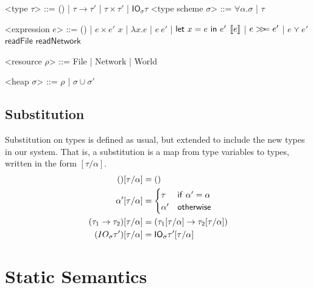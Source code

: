 \begin{grammar}

  <type $\tau$> ::= () | $\tau \rightarrow \tau'$ | $\tau \times \tau'$ | $\textsf{IO}_\sigma \tau$
  <type scheme $\sigma$> ::= $\forall \alpha . \sigma$ | $\tau$

<expression $e$> ::= () | $e \times e'$
\alt $x$ | $\lambda x . e$ | $e \ e'$ | $\mathsf{let} \ x = e \ \mathsf{in} \ e'$
\alt $[\![ e]\!]$ | $e >\!\!>\!\!= e'$ | $e \curlyvee e'$
\alt $\textsf{readFile}$
\alt $\textsf{readNetwork}$

<resource $\rho$> ::= \textsf{File} | \textsf{Network} | \textsf{World}

<heap $\sigma$> ::= $\rho$ | $\sigma \cup \sigma'$

\end{grammar}

\subsection{Substitution}
Substitution on types is defined as usual, but extended to include the
new types in our system. That is, a substitution is a map from type
variables to types, written in the form $[\tau/\alpha]$. 
\begin{align*}
  () [\tau/\alpha] &= () \\
  \alpha' [\tau/\alpha] &=
             \begin{cases}
               \tau & \mathsf{if} \ \alpha' = \alpha \\
               \alpha' & \mathsf{otherwise}
             \end{cases} \\
  (\tau_1 \rightarrow \tau_2)[\tau/\alpha] &= (\tau_1[\tau/\alpha] \rightarrow \tau_2[\tau/\alpha]) \\
  (IO_\sigma \tau')[\tau/\alpha] &= \mathsf{IO}_\sigma \tau'[\tau/\alpha]
\end{align*}

\section{Static Semantics}

